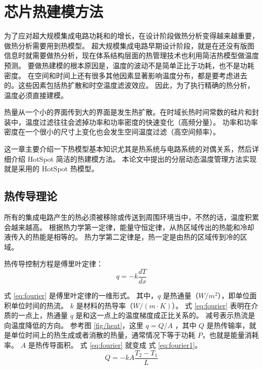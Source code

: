 
\chapter{芯片热建模方法}\label{chap:model}

为了应对超大规模集成电路功耗和的增长，在设计阶段做热分析变得越来越重要，做热分析需要用到热模型。
超大规模集成电路早期设计阶段，就是在还没有版图信息时就需要做热分析，现在体系结构层面的热管理技术也利用简洁热模型做温度预测。
要做热建模的根本原因是，温度的波动不是简单正比于功耗，也不是功耗密度。
在空间和时间上还有很多其他因素显著影响温度分布，都是要考虑进去的。这些因素包括热扩散和时空温度滤波效应。
因此，为了执行精确的热分析，温度必须直接建模。

热量从一个小的界面传到大的界面是发生热扩散。在时域长热时间常数的硅片和封装中，温度过滤往往会滤掉功率和功率密度的快速变化（高频分量）。
功率和功率密度在一个很小的尺寸上变化也会发生空间温度过滤（高空间频率）。

这一章主要介绍一下热模型基本知识尤其是热系统与电路系统的对偶关系，然后详细介绍 HotSpot 简洁的热建模方法。
本论文中提出的分层动态温度管理方法实现就是采用的 HotSpot 热模型。

\section{热传导理论}\label{sec:thermal}
所有的集成电路产生的热必须被移除或传送到周围环境当中，不然的话，温度积累会越来越高。
根据热力学第一定律，能量守恒定律，从热区域传出的热能和冷却液传入的热能是相等的。
热力学第二定律是，热一定是由热的区域传到冷的区域。

热传导控制方程是傅里叶定律：
\begin{equation}\label{eq:fourier}
q = -k\frac{dT}{dx}
\end{equation}

式 \eqref{eq:fourier} 是傅里叶定律的一维形式。
其中，$ q $ 是热通量（$W/m^2$），即单位面积单位时间的热流。 $k $ 是材料的热导率（$W/(m \cdot K)$）。
式 \eqref{eq:fourier} 表明在介质的一点上，热通量 $q$ 是和这一点上的温度梯度成正比关系的。
减号表示热流是向温度降低的方向。
参考图 \ref{fig/heat}，这里 $q = Q/A $ ，其中 $Q$ 是热传输率，就是单位时间上的热生成或者消散的热量，通常情况下等于功耗 $P$，也就是能量消耗率。 
$A$ 是热传导面积。 式 \eqref{eq:fourier} 就变成 式 \eqref{eq:fourier1}。
\begin{equation}\label{eq:fourier1}
Q = -kA\frac{T_2-T_1}{L}
\end{equation}

